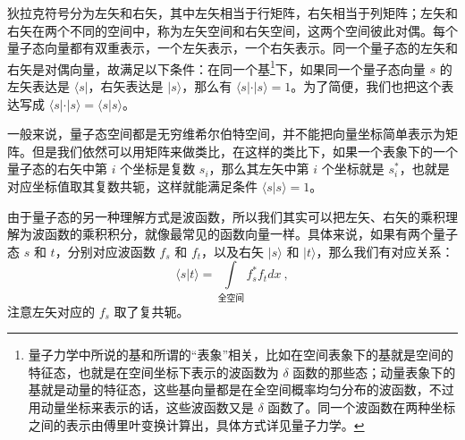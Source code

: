 狄拉克符号分为左矢和右矢，其中左矢相当于行矩阵，右矢相当于列矩阵；左矢和右矢在两个不同的空间中，称为左矢空间和右矢空间，这两个空间彼此对偶。每个量子态向量都有双重表示，一个左矢表示，一个右矢表示。同一个量子态的左矢和右矢是对偶向量，故满足以下条件：在同一个基\footnote{量子力学中所说的基和所谓的“表象”相关，比如在空间表象下的基就是空间的特征态，也就是在空间坐标下表示的波函数为 $\delta$ 函数的那些态；动量表象下的基就是动量的特征态，这些基向量都是在全空间概率均匀分布的波函数，不过用动量坐标来表示的话，这些波函数又是 $\delta$ 函数了。同一个波函数在两种坐标之间的表示由傅里叶变换计算出，具体方式详见量子力学。}下，如果同一个量子态向量 $s$ 的左矢表达是 $\langle s|$，右矢表达是 $|s\rangle$，那么有 $\langle s|\cdot|s\rangle=1$。为了简便，我们也把这个表达写成 $\langle s|\cdot|s\rangle=\langle s|s\rangle$。

一般来说，量子态空间都是无穷维希尔伯特空间，并不能把向量坐标简单表示为矩阵。但是我们依然可以用矩阵来做类比，在这样的类比下，如果一个表象下的一个量子态的右矢中第 $i$ 个坐标是复数 $s_i$，那么其左矢中第 $i$ 个坐标就是 $s_i^*$，也就是对应坐标值取其复数共轭，这样就能满足条件 $\langle s|s\rangle=1$。

由于量子态的另一种理解方式是波函数，所以我们其实可以把左矢、右矢的乘积理解为波函数的乘积积分，就像最常见的函数向量一样。具体来说，如果有两个量子态 $s$ 和 $t$，分别对应波函数 $f_s$ 和 $f_t$，以及右矢 $|s\rangle$ 和 $|t\rangle$，那么我们有对应关系：
\begin{equation}\langle s|t\rangle=\int\limits_{\text{全空间}}f_s^*f_tdx~,\end{equation}
注意左矢对应的 $f_s$ 取了复共轭。









